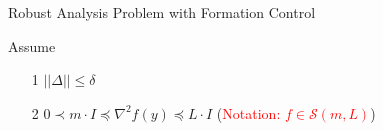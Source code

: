 \documentclass{beamer}
\begin{document}
\begin{frame}{Robust Analysis Problem with Formation Control}
\begin{overprint}
			\begin{figure}[!htb]
			\centering
			
		\end{figure}
	\begin{block}{Assume}
		\begin{itemize}
			\item[1] $||\Delta||\leq \delta$
			\item[2] $0 \prec m \cdot I\preceq \nabla^2 f(y) \preceq L\cdot I$ (\textcolor{red}{Notation: $f\in \mathcal{S}(m,L)$}) 
		\end{itemize}
	\end{block}	
	\end{overprint}
\end{frame}
\end{document}
